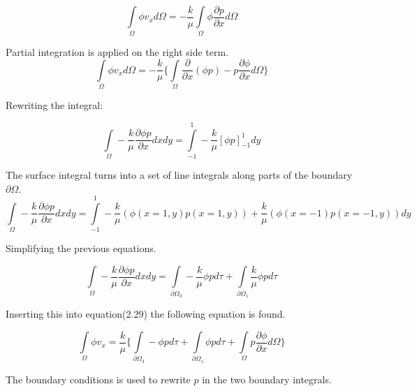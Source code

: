 \documentclass[a4paper]{report}
\begin{document}
\begin{equation}
\int\limits_{\Omega}\phi v_x d\Omega=-\frac{k}{\mu}\int\limits_{\Omega}\phi\frac{\partial p}{\partial x}d\Omega
\end{equation}

Partial integration is applied on the right side term.
\begin{equation}
\int\limits_{\Omega}\phi v_x d\Omega=  -\frac{k}{\mu}\{\int\limits_{\Omega}\frac{\partial }{\partial x}(\phi p)-p\frac{\partial \phi}{\partial x}d\Omega\}
\end{equation}

Rewriting the integral:

\begin{equation}
 \int\limits_{\Omega}-\frac{k}{\mu}\frac{\partial \phi p}{\partial x}dxdy=\int\limits_{-1}^{1}-\frac{k}{\mu}[\phi p]^{1}_{-1}dy
\end{equation}

The surface integral turns into a set of line integrals along parts of the boundary $\partial\Omega$.
\begin{equation}
\int\limits_{\Omega}-\frac{k}{\mu}\frac{\partial \phi p}{\partial x}dxdy=  \int\limits_{-1}^{1}-\frac{k}{\mu}(\phi(x=1,y)p(x=1,y))+\frac{k}{\mu}(\phi(x=-1)p(x=-1,y))dy
\end{equation}

Simplifying the previous equations.

\begin{equation}
\int\limits_{\Omega}-\frac{k}{\mu}\frac{\partial \phi p}{\partial x}dxdy =\int\limits_{\partial\Omega_3}-\frac{k}{\mu}\phi pd\tau+\int\limits_{\partial\Omega_1}\frac{k}{\mu}\phi pd\tau
\end{equation}

Inserting this into equation(2.29) the following equation is found.

\begin{equation}
	\int\limits_{\Omega}\phi v_x = \frac{k}{\mu}\{\int\limits_{\partial\Omega_3}-\phi pd\tau+\int\limits_{\partial\Omega_1}\phi pd\tau+\int\limits_{\Omega}p\frac{\partial \phi}{\partial x}d\Omega\}
\end{equation}

The boundary conditions is used to rewrite $p$ in the two boundary integrals.

\end{document}
